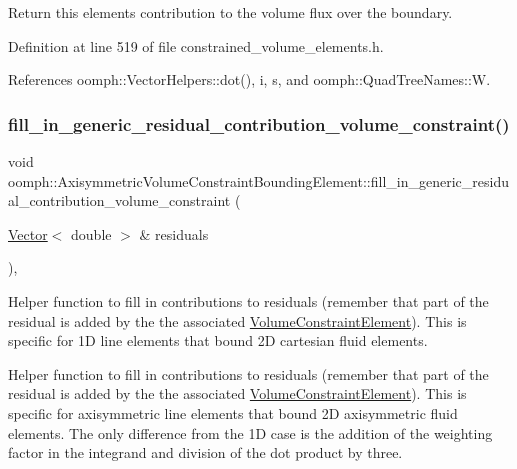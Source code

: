 Return this element\textquotesingle{}s contribution to the volume flux over the boundary. 



Definition at line 519 of file constrained\+\_\+volume\+\_\+elements.\+h.



References oomph\+::\+Vector\+Helpers\+::dot(), i, s, and oomph\+::\+Quad\+Tree\+Names\+::W.

\mbox{\label{classoomph_1_1AxisymmetricVolumeConstraintBoundingElement_a2a3f3b86079f27d52679f357f5276d91}} 
\subsubsection{\texorpdfstring{fill\+\_\+in\+\_\+generic\+\_\+residual\+\_\+contribution\+\_\+volume\+\_\+constraint()}{fill\_in\_generic\_residual\_contribution\_volume\_constraint()}}
{\footnotesize\ttfamily void oomph\+::\+Axisymmetric\+Volume\+Constraint\+Bounding\+Element\+::fill\+\_\+in\+\_\+generic\+\_\+residual\+\_\+contribution\+\_\+volume\+\_\+constraint (\begin{DoxyParamCaption}\item[{\hyperlink{classoomph_1_1Vector}{Vector}$<$ double $>$ \&}]{residuals }\end{DoxyParamCaption})\hspace{0.3cm}{\ttfamily [protected]}, {\ttfamily [virtual]}}



Helper function to fill in contributions to residuals (remember that part of the residual is added by the the associated \hyperlink{classoomph_1_1VolumeConstraintElement}{Volume\+Constraint\+Element}). This is specific for 1D line elements that bound 2D cartesian fluid elements. 

Helper function to fill in contributions to residuals (remember that part of the residual is added by the the associated \hyperlink{classoomph_1_1VolumeConstraintElement}{Volume\+Constraint\+Element}). This is specific for axisymmetric line elements that bound 2D axisymmetric fluid elements. The only difference from the 1D case is the addition of the weighting factor in the integrand and division of the dot product by three. 

